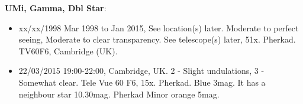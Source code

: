{\bf UMi, Gamma, Dbl Star}:
\begin{itemize}
\item xx/xx/1998 Mar 1998 to Jan 2015, See location(s) later. Moderate to perfect seeing, Moderate to clear transparency. See telescope(s) later, 51x. Pherkad. TV60F6, Cambridge (UK).
\item 22/03/2015 19:00-22:00, Cambridge, UK. 2 - Slight undulations, 3 - Somewhat clear. Tele Vue 60 F6, 15x. Pherkad. Blue 3mag. It has a neighbour star 10.30mag. Pherkad Minor orange 5mag.
\end{itemize}
